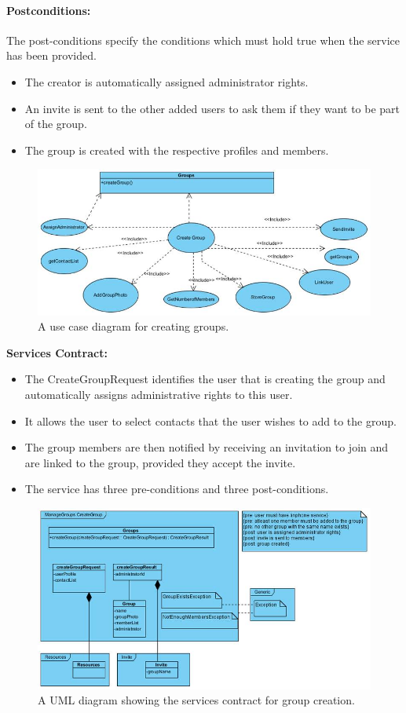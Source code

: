 \documentclass[11pt]{article}
\begin{document}
\paragraph{{Postconditions:}}The post-conditions specify the conditions which must hold true when the service has been provided.
\begin{itemize}
\item	The creator is automatically assigned administrator rights.
\item	An invite is sent to the other added users to ask them if they want to be part of the group.
\item	The group is created with the respective profiles and members.
\end{itemize}
\begin{figure}[H]
\centering
\includegraphics[width=5in]{./images/FR-create.jpg}
\caption[UC-figure-create-group]{A use case diagram for creating groups.}
\label{UC-figure-create-group}
\end{figure}
\textbf{Services Contract:}
\begin{itemize}
\item The CreateGroupRequest identifies the user that is creating the group and automatically assigns administrative rights to this user.
\item It allows the user to select contacts that the user wishes to add to the group.
\item The group members are then notified by receiving an invitation to join and are linked to the group, provided they accept the invite.
\item The service has three pre-conditions and three post-conditions.
\end{itemize}
\begin{figure}[H]
\centering
\includegraphics[width=5in]{./images/serviceContract-create.jpg} \newline
\caption[Create Group Services Contract]{A UML diagram showing the services contract for group creation.}
\label{SC-figure-create-group}
\end{figure}
\end{document}
